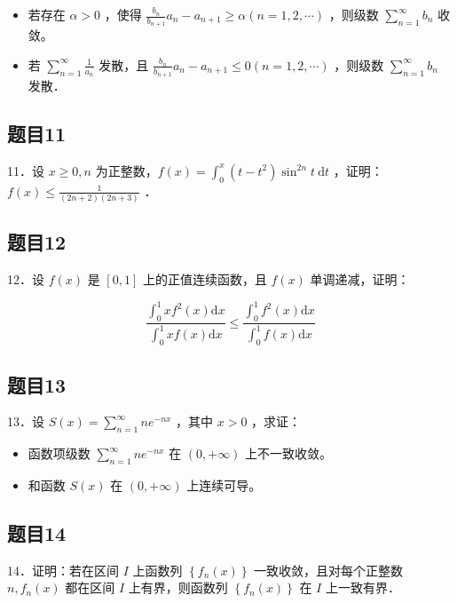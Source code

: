 \documentclass{article}
\begin{document}
\begin{itemize}
  \item[（1）] 若存在 \(\alpha>0\) ，使得 \(\frac{b_{n}}{b_{n+1}} a_{n}-a_{n+1} \geq \alpha(n=1,2, \cdots)\) ，则级数 \(\sum_{n=1}^{\infty} b_{n}\) 收敛。
  \item[（2）] 若 \(\sum_{n=1}^{\infty} \frac{1}{a_{n}}\) 发散，且 \(\frac{b_{n}}{b_{n+1}} a_{n}-a_{n+1} \leq 0(n=1,2, \cdots)\) ，则级数 \(\sum_{n=1}^{\infty} b_{n}\) 发散．
\end{itemize}

\subsection{题目11}
11．设 \(x \geq 0, n\) 为正整数，\(f(x)=\int_{0}^{x}\left(t-t^{2}\right) \sin ^{2 n} t \mathrm{~d} t\) ，证明：\(f(x) \leq \frac{1}{(2 n+2)(2 n+3)}\) ．

\subsection{题目12}
12．设 \(f(x)\) 是 \([0,1]\) 上的正值连续函数，且 \(f(x)\) 单调递减，证明：

\[
\frac{\int_{0}^{1} x f^{2}(x) \mathrm{d} x}{\int_{0}^{1} x f(x) \mathrm{d} x} \leq \frac{\int_{0}^{1} f^{2}(x) \mathrm{d} x}{\int_{0}^{1} f(x) \mathrm{d} x}
\]

\subsection{题目13}
13．设 \(S(x)=\sum_{n=1}^{\infty} n e^{-n x}\) ，其中 \(x>0\) ，求证：

\begin{itemize}
  \item[（1）] 函数项级数 \(\sum_{n=1}^{\infty} n e^{-n x}\) 在 \((0,+\infty)\) 上不一致收敛。
  \item[（2）] 和函数 \(S(x)\) 在 \((0,+\infty)\) 上连续可导。
\end{itemize}

\subsection{题目14}
14．证明：若在区间 \(I\) 上函数列 \(\left\{f_{n}(x)\right\}\) 一致收敛，且对每个正整数 \(n, f_{n}(x)\) 都在区间 \(I\) 上有界，则函数列 \(\left\{f_{n}(x)\right\}\) 在 \(I\) 上一致有界．
\end{document}
